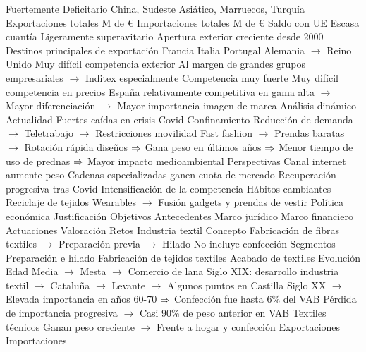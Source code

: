 \documentclass{nuevotema}
\begin{document}
\begin{esquemal}
				\4[] Fuertemente Deficitario
				\4[] China, Sudeste Asiático, Marruecos, Turquía
				\4 Exportaciones totales
				 M de €
				\4 Importaciones totales
				 M de €
				\4 Saldo con UE
				\4[] Escasa cuantía
				\4[] Ligeramente superavitario
				\4 Apertura exterior creciente desde 2000
				\4 Destinos principales de exportación
				\4[] Francia
				\4[] Italia
				\4[] Portugal
				\4[] Alemania
				\4[] $\to$ Reino Unido
				\4 Muy difícil competencia exterior
				\4[] Al margen de grandes grupos empresariales
				\4[] $\to$ Inditex especialmente
				\4[] Competencia muy fuerte
				\4[] Muy difícil competencia en precios
				\4[] España relativamente competitiva en gama alta
				\4[] $\to$ Mayor diferenciación
				\4[] $\to$ Mayor importancia imagen de marca
			\3 Análisis dinámico
				\4 Actualidad
				\4[] Fuertes caídas en crisis Covid
				\4[] Confinamiento
				\4[] Reducción de demanda
				\4[] $\to$ Teletrabajo
				\4[] $\to$ Restricciones movilidad
				\4[] Fast fashion
				\4[] $\to$ Prendas baratas
				\4[] $\to$ Rotación rápida diseños
				\4[] $\Rightarrow$ Gana peso en últimos años
				\4[] $\Rightarrow$ Menor tiempo de uso de prednas
				\4[] $\Rightarrow$ Mayor impacto medioambiental
				\4 Perspectivas
				\4[] Canal internet aumente peso
				\4[] Cadenas especializadas ganen cuota de mercado
				\4[] Recuperación progresiva tras Covid
				\4[] Intensificación de la competencia
				\4[] Hábitos cambiantes
				\4[] Reciclaje de tejidos
				\4[] Wearables
				\4[] $\to$ Fusión gadgets y prendas de vestir
			\3 Política económica
				\4 Justificación
				\4 Objetivos
				\4 Antecedentes
				\4 Marco jurídico
				\4 Marco financiero
				\4 Actuaciones
				\4 Valoración
				\4 Retos
			\3 Industria textil
				\4 Concepto
				\4[] Fabricación de fibras textiles
				\4[] $\to$ Preparación previa
				\4[] $\to$ Hilado
				\4[] No incluye confección
				\4 Segmentos
				\4[] Preparación e hilado
				\4[] Fabricación de tejidos textiles
				\4[] Acabado de textiles
				\4 Evolución
				\4[] Edad Media
				\4[] $\to$ Mesta
				\4[] $\to$ Comercio de lana
				\4[] Siglo XIX: desarrollo industria textil
				\4[] $\to$ Cataluña
				\4[] $\to$ Levante
				\4[] $\to$ Algunos puntos en Castilla
				\4[] Siglo XX
				\4[] $\to$ Elevada importancia en años 60-70
				\4[] $\Rightarrow$ Confección fue hasta 6\% del VAB
				\4[] Pérdida de importancia progresiva
				\4[] $\to$ Casi 90\% de peso anterior en VAB
				\4 Textiles técnicos
				\4[] Ganan peso creciente
				\4[] $\to$ Frente a hogar y confección
				\4 Exportaciones
				\4[]
				\4 Importaciones

\end{esquemal}
\end{document}
